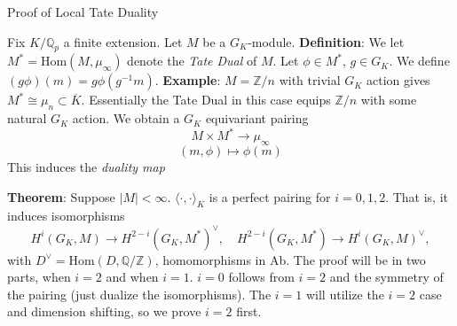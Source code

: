 \documentclass[class=article, crop=false]{standalone}
\begin{document}
\begin{center}
    Proof of Local Tate Duality
\end{center}
Fix $K/\mathbb{Q}_p$ a finite extension. Let $M$ be a $G_K$-module. 
\vskip 5pt
\textbf{Definition}: We let $M^* = \text{Hom}(M, \mu_{\infty})$ denote the \textit{Tate Dual} of $M$. 
\vskip 5pt 
Let $\phi \in M^*$, $g\in G_K$. We define $(g\phi)(m)=g\phi(g^{-1}m)$. 
\vskip 5pt 
\textbf{Example}: $M=\mathbb{Z}/n$ with trivial $G_K$ action gives $M^*\cong \mu_{n}\subset \overline{K}$. Essentially the Tate Dual in this case equips $\mathbb{Z}/n$ with some natural $G_K$ action.
\vskip 5pt
We obtain a $G_K$ equivariant pairing
\[M\times M^* \to \mu_{\infty}\]
\[(m, \phi) \mapsto \phi(m)\]
This induces the \textit{duality map}


\textbf{Theorem}: Suppose $|M|<\infty$. $\langle \cdot, \cdot \rangle_K$ is a perfect pairing for $i=0,1,2$. 
\vskip 3pt That is, it induces isomorphisms \[H^i(G_K,M) \to H^{2-i}(G_K, M^{*})^{\vee}, \quad  H^{2-i}(G_K,M^{*}) \to H^i(G_K, M)^{\vee},\]
with $D^{\vee} = \text{Hom}(D, \mathbb{Q}/\mathbb{Z})$, homomorphisms in Ab.
\vskip 5pt
The proof will be in two parts, when $i=2$ and when $i=1$. $i=0$ follows from $i=2$ and the symmetry of the pairing (just dualize the isomorphisms). The $i=1$ will utilize the $i=2$ case and dimension shifting, so we prove $i=2$ first.
\end{document}
